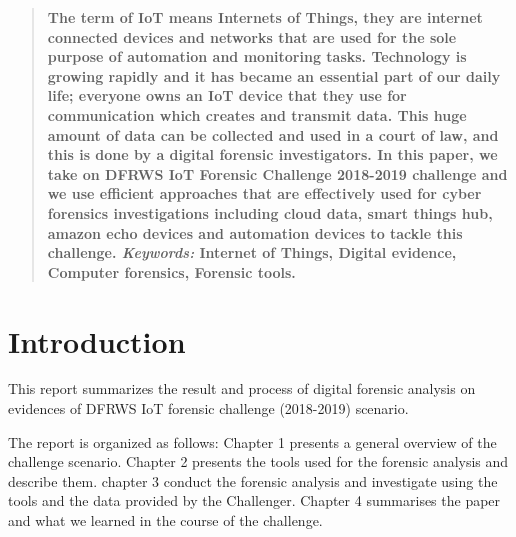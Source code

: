 \documentclass{easychair}
\begin{document}
\begin{abstract}
\textbf{The term of IoT means Internets of Things, they are internet connected devices and networks that are used for the sole purpose of automation and monitoring tasks. Technology is growing rapidly and it has became an essential part of our daily life; everyone owns an IoT device that they use for communication which creates and transmit data. This huge amount of data can be  collected and used in a court of law, and this is done by a digital forensic investigators. In this paper, we take on DFRWS IoT Forensic Challenge 2018-2019 challenge and we use efficient approaches that are effectively used for cyber forensics investigations including cloud data, smart things hub, amazon echo devices and automation devices to tackle this challenge.
\textit{Keywords:} Internet of Things, Digital evidence, Computer forensics, Forensic tools.}
\end{abstract}



\section{Introduction}
\label{sect:introduction} This report summarizes the result and process of digital forensic analysis on evidences of DFRWS IoT forensic challenge (2018-2019) scenario.

The report is organized as follows: Chapter 1 presents a general overview of the challenge scenario. Chapter 2 presents the tools used for the forensic analysis and describe them. chapter 3 conduct the forensic analysis and investigate using the tools and the data provided by the Challenger. Chapter 4 summarises the paper and what we learned in the course of the challenge.
\end{document}
